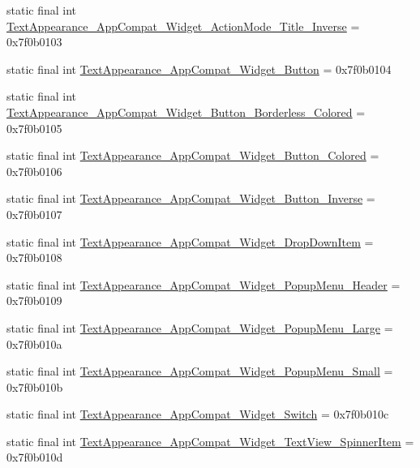 \begin{CompactItemize}
\item 
static final int \hyperlink{classandroid_1_1support_1_1v7_1_1mediarouter_1_1_r_1_1style_de80fd2ac075c96b82ddaafe01da8f1f}{TextAppearance\_\-AppCompat\_\-Widget\_\-ActionMode\_\-Title\_\-Inverse} = 0x7f0b0103
\item 
static final int \hyperlink{classandroid_1_1support_1_1v7_1_1mediarouter_1_1_r_1_1style_7c6569cf50a7a17613c95fa55ab7e5fd}{TextAppearance\_\-AppCompat\_\-Widget\_\-Button} = 0x7f0b0104
\item 
static final int \hyperlink{classandroid_1_1support_1_1v7_1_1mediarouter_1_1_r_1_1style_4a9d10aefa726785207a6efd789d3f01}{TextAppearance\_\-AppCompat\_\-Widget\_\-Button\_\-Borderless\_\-Colored} = 0x7f0b0105
\item 
static final int \hyperlink{classandroid_1_1support_1_1v7_1_1mediarouter_1_1_r_1_1style_f3b1a7368bf1687aefc1b17ab0ccf286}{TextAppearance\_\-AppCompat\_\-Widget\_\-Button\_\-Colored} = 0x7f0b0106
\item 
static final int \hyperlink{classandroid_1_1support_1_1v7_1_1mediarouter_1_1_r_1_1style_d245857add268413d791a9823a9ae15d}{TextAppearance\_\-AppCompat\_\-Widget\_\-Button\_\-Inverse} = 0x7f0b0107
\item 
static final int \hyperlink{classandroid_1_1support_1_1v7_1_1mediarouter_1_1_r_1_1style_18e73419c9be2d7d62538e5adccef69a}{TextAppearance\_\-AppCompat\_\-Widget\_\-DropDownItem} = 0x7f0b0108
\item 
static final int \hyperlink{classandroid_1_1support_1_1v7_1_1mediarouter_1_1_r_1_1style_a408bc840a9bb88c2a96442a8585b976}{TextAppearance\_\-AppCompat\_\-Widget\_\-PopupMenu\_\-Header} = 0x7f0b0109
\item 
static final int \hyperlink{classandroid_1_1support_1_1v7_1_1mediarouter_1_1_r_1_1style_e8a642a6f5951e774c5d829cf53423f5}{TextAppearance\_\-AppCompat\_\-Widget\_\-PopupMenu\_\-Large} = 0x7f0b010a
\item 
static final int \hyperlink{classandroid_1_1support_1_1v7_1_1mediarouter_1_1_r_1_1style_8ab8cd6281c30da4242133f8a361acc7}{TextAppearance\_\-AppCompat\_\-Widget\_\-PopupMenu\_\-Small} = 0x7f0b010b
\item 
static final int \hyperlink{classandroid_1_1support_1_1v7_1_1mediarouter_1_1_r_1_1style_2d029eb32778cb3e9ae72484957e2d86}{TextAppearance\_\-AppCompat\_\-Widget\_\-Switch} = 0x7f0b010c
\item 
static final int \hyperlink{classandroid_1_1support_1_1v7_1_1mediarouter_1_1_r_1_1style_f4280ff05a751aa1f55e0c964d74c03f}{TextAppearance\_\-AppCompat\_\-Widget\_\-TextView\_\-SpinnerItem} = 0x7f0b010d

\end{CompactItemize}
